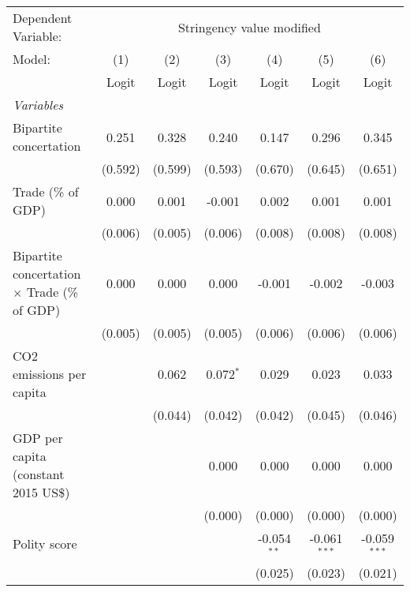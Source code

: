 
\begingroup
\centering
\begin{tabular}{lcccccc}
   \toprule
   Dependent Variable: & \multicolumn{6}{c}{Stringency value modified}\\
   Model:                                              & (1)     & (2)     & (3)         & (4)           & (5)            & (6)\\  
                                                       &  Logit  & Logit   & Logit       & Logit         & Logit          & Logit\\  
   \midrule
   \emph{Variables}\\
   Bipartite concertation                              & 0.251   & 0.328   & 0.240       & 0.147         & 0.296          & 0.345\\   
                                                       & (0.592) & (0.599) & (0.593)     & (0.670)       & (0.645)        & (0.651)\\   
   Trade (\% of GDP)                                   & 0.000   & 0.001   & -0.001      & 0.002         & 0.001          & 0.001\\   
                                                       & (0.006) & (0.005) & (0.006)     & (0.008)       & (0.008)        & (0.008)\\   
   Bipartite concertation $\times$ Trade (\% of GDP)   & 0.000   & 0.000   & 0.000       & -0.001        & -0.002         & -0.003\\   
                                                       & (0.005) & (0.005) & (0.005)     & (0.006)       & (0.006)        & (0.006)\\   
   CO2 emissions per capita                            &         & 0.062   & 0.072$^{*}$ & 0.029         & 0.023          & 0.033\\   
                                                       &         & (0.044) & (0.042)     & (0.042)       & (0.045)        & (0.046)\\   
   GDP per capita (constant 2015 US\$)                 &         &         & 0.000       & 0.000         & 0.000          & 0.000\\   
                                                       &         &         & (0.000)     & (0.000)       & (0.000)        & (0.000)\\   
   Polity score                                        &         &         &             & -0.054$^{**}$ & -0.061$^{***}$ & -0.059$^{***}$\\   
                                                       &         &         &             & (0.025)       & (0.023)        & (0.021)\\   

\end{tabular}
